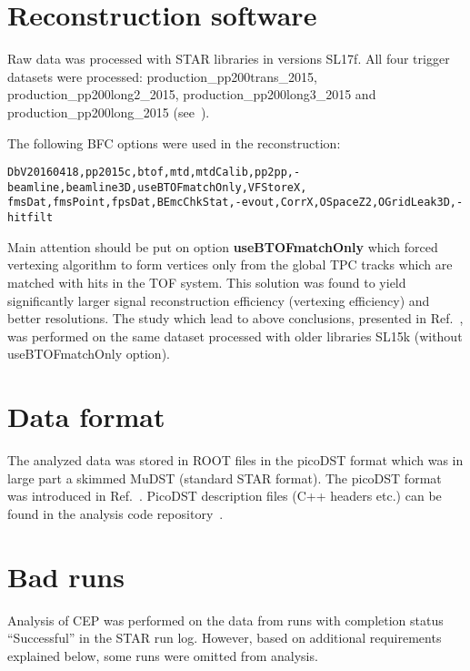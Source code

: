 

\section{Reconstruction software}\label{sec:recoSoftware}

Raw data was processed with STAR libraries in versions SL17f. All four trigger datasets were processed: production\_pp200trans\_2015, production\_pp200long2\_2015, production\_pp200long3\_2015 and production\_pp200long\_2015 (see~\cite{ProductionList}).

The following BFC options were used in the reconstruction:\vspace{-5pt}
\begin{verbatim}
DbV20160418,pp2015c,btof,mtd,mtdCalib,pp2pp,-beamline,beamline3D,useBTOFmatchOnly,VFStoreX,
fmsDat,fmsPoint,fpsDat,BEmcChkStat,-evout,CorrX,OSpaceZ2,OGridLeak3D,-hitfilt
\end{verbatim}
Main attention should be put on option \textbf{useBTOFmatchOnly} which forced vertexing algorithm to form vertices only from the global TPC tracks which are matched with hits in the TOF system. This solution was found to yield significantly larger signal reconstruction efficiency (vertexing efficiency) and better resolutions. The study which lead to above conclusions, presented in Ref.~\cite{RevertexingProposal}, was performed on the same dataset processed with older libraries SL15k (without useBTOFmatchOnly option).



\section{Data format}\label{sec:dataFormat}

The analyzed data was stored in ROOT files in the picoDST format which was in large part a skimmed MuDST (standard STAR format). The picoDST format was introduced in Ref.~\cite{PicoDstDescription}. PicoDST description files (C++ headers etc.) can be found in the analysis code repository~\cite{AnalysisCodeRepo}.

\section{Bad runs}\label{sec:badRuns}

Analysis of CEP was performed on the data from runs with completion status ``Successful'' in the STAR run log. However, based on additional requirements explained below, some runs were omitted from analysis.

